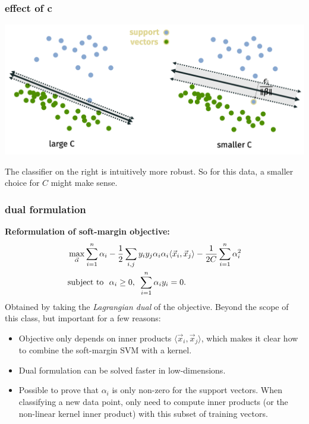 \documentclass[handout,compress]{beamer}
\begin{document}
\begin{frame}
	\frametitle{effect of c}
	\begin{center}
		\includegraphics[width =.9\textwidth]{effect_c.png}
		
		The classifier on the right is intuitively more robust. So for this data, a smaller choice for $C$ might make sense. 
	\end{center}
\end{frame}

\begin{frame}
	\frametitle{dual formulation}
	\small
	\textbf{Reformulation of soft-margin objective:}
	\begin{align*}
	&\max_{\vec{\alpha}} \sum_{i=1}^n\alpha_i - \frac{1}{2}\sum_{i,j} y_iy_j\alpha_i\alpha_i \langle\vec{x}_i,\vec{x}_j\rangle - \frac{1}{2C}  \sum_{i=1}^n\alpha_i^2 \\
	&\text{subject to \,\,}  \alpha_i\geq 0, \,\,\,\sum_{i=1}^n\alpha_iy_i = 0.
	\end{align*}
	Obtained by taking the \emph{Lagrangian dual} of the objective. Beyond the scope of this class, but important for a few reasons:
	\begin{itemize}
		\item Objective only depends on inner products $\langle\vec{x}_i,\vec{x}_j\rangle$, which makes it clear how to combine the soft-margin SVM with a kernel. 
		\item Dual formulation can be solved faster in low-dimensions. 
		\item Possible to prove that $\alpha_i$ is only non-zero for the support vectors. When classifying a new data point, only need to compute inner products (or the non-linear kernel inner product) with this subset of training vectors. 
	\end{itemize}
\end{frame}
\end{document}
